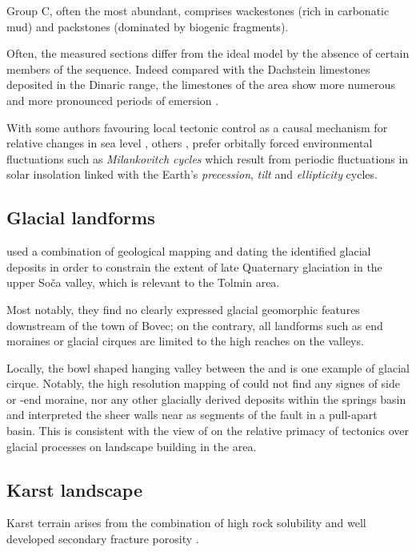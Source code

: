 Group C, often the most abundant, comprises wackestones (rich in carbonatic mud) and packstones (dominated by biogenic fragments).


Often, the measured sections differ from the ideal model by the absence of certain members of the sequence. Indeed compared with the Dachstein limestones deposited in the Dinaric range, the limestones of the  area show more numerous and more pronounced periods of emersion \citep{ogorelec1996dachstein}.

 With some authors favouring local tectonic control as a causal mechanism  for relative changes in sea level \citep{goldhammer1990depositional,enos1998lofer}, others \citep{fisher1964lofer,balog1997shallow,haas2004characteristics,doi:10.1130/G21578.1}, prefer orbitally forced environmental fluctuations such as \emph{Milankovitch cycles} which result from periodic fluctuations in solar insolation linked with the Earth's \emph{precession}, \emph{tilt} and \emph{ellipticity} cycles. 

 \subsection{Glacial landforms}
 \citet{bavec2004late} used a combination of geological mapping and dating the identified glacial deposits in order to constrain the extent of late Quaternary glaciation in the upper So\v{c}a valley, which is relevant to the Tolmin area.

 Most notably, they find no clearly expressed glacial geomorphic features downstream of the town of Bovec; on the contrary, all landforms such as end moraines or glacial cirques are limited to the high reaches on the valleys. 

Locally, the bowl shaped hanging valley between the  and  is one example of glacial cirque. Notably, the high resolution mapping of \citet{cunningham2006application} could not find any signes of side or -end moraine, nor any other glacially derived deposits within the  springs basin and interpreted the sheer walls near  as segments of the  fault in a pull-apart basin. 
This is consistent with the view of \citet{vsmuc2009tectonic} on the relative primacy of tectonics over glacial processes on landscape building in the  area.

 \subsection{Karst landscape}
Karst terrain arises from the combination of high rock solubility and well developed secondary fracture porosity \citep{ford2013karst}. 

